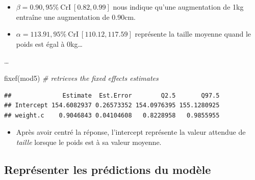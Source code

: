 \documentclass[
  a4paper,11pt,twoside,onecolumn,openright,final,oldfontcommands]{memoir}
\newenvironment{Shaded}{\begin{snugshade}}{\end{snugshade}}
\newcommand{\AttributeTok}[1]{\textcolor[rgb]{0.77,0.63,0.00}{#1}}
\newcommand{\CommentTok}[1]{\textcolor[rgb]{0.56,0.35,0.01}{\textit{#1}}}
\newcommand{\DecValTok}[1]{\textcolor[rgb]{0.00,0.00,0.81}{#1}}
\newcommand{\FunctionTok}[1]{\textcolor[rgb]{0.00,0.00,0.00}{#1}}
\newcommand{\NormalTok}[1]{#1}
\newcommand{\OtherTok}[1]{\textcolor[rgb]{0.56,0.35,0.01}{#1}}
\newcommand{\SpecialCharTok}[1]{\textcolor[rgb]{0.00,0.00,0.00}{#1}}
\providecommand{\tightlist}{%
  \setlength{\itemsep}{0pt}\setlength{\parskip}{0pt}}
\theoremstyle{definition}
\theoremstyle{definition}
\theoremstyle{definition}
\theoremstyle{remark}
\begin{document}
\begin{itemize}
\tightlist
\item
  \(\beta = 0.90, 95\% \ \text{CrI} \ [0.82, 0.99]\) nous indique qu'une augmentation de 1kg entraîne une augmentation de 0.90cm.
\item
  \(\alpha = 113.91, 95\% \ \text{CrI} \ [110.12, 117.59]\) représente la taille moyenne quand le poids est égal à 0kg\ldots{}
\end{itemize}

\ldots{}

\begin{Shaded}
\end{Shaded}

\begin{Shaded}
\begin{Highlighting}[]
\FunctionTok{fixef}\NormalTok{(mod5) }\CommentTok{\# retrieves the fixed effects estimates}
\end{Highlighting}
\end{Shaded}

\begin{verbatim}
##              Estimate  Est.Error        Q2.5       Q97.5
## Intercept 154.6082937 0.26573352 154.0976395 155.1280925
## weight.c    0.9046843 0.04104608   0.8228958   0.9855955
\end{verbatim}

\begin{itemize}
\tightlist
\item
  Après avoir centré la réponse, l'intercept représente la valeur attendue de \emph{taille} lorsque le poids est à sa valeur moyenne.
\end{itemize}

\hypertarget{repruxe9senter-les-pruxe9dictions-du-moduxe8le}{%
\subsection{Représenter les prédictions du modèle}\label{repruxe9senter-les-pruxe9dictions-du-moduxe8le}}
\end{document}
